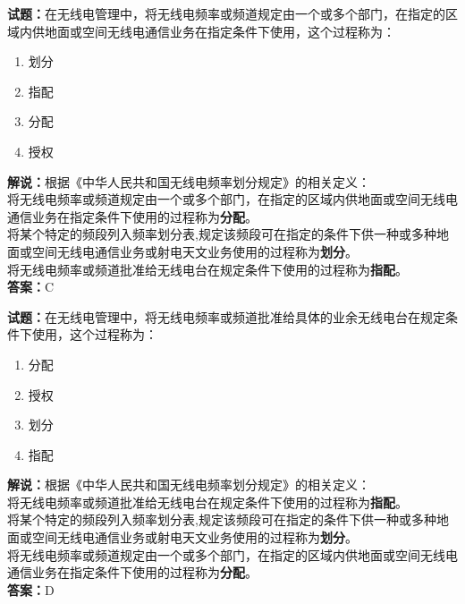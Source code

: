 \documentclass{ctexbook}
\begin{document}
\bigskip


\noindent\textbf{试题：}在无线电管理中，将无线电频率或频道规定由一个或多个部门，在指定的区域内供地面或空间无线电通信业务在指定条件下使用，这个过程称为：
\begin{enumerate}[leftmargin=3em]
\item 划分
\item 指配
\item 分配
\item 授权
\end{enumerate}
\noindent\textbf{解说：}根据《中华人民共和国无线电频率划分规定》的相关定义：\\将无线电频率或频道规定由一个或多个部门，在指定的区域内供地面或空间无线电通信业务在指定条件下使用的过程称为\textbf{分配}。\\将某个特定的频段列入频率划分表,规定该频段可在指定的条件下供一种或多种地面或空间无线电通信业务或射电天文业务使用的过程称为\textbf{划分}。\\将无线电频率或频道批准给无线电台在规定条件下使用的过程称为\textbf{指配}。\\
\textbf{答案：}C


\bigskip


\noindent\textbf{试题：}在无线电管理中，将无线电频率或频道批准给具体的业余无线电台在规定条件下使用，这个过程称为：
\begin{enumerate}[leftmargin=3em]
\item 分配
\item 授权
\item 划分
\item 指配
\end{enumerate}
\noindent\textbf{解说：}根据《中华人民共和国无线电频率划分规定》的相关定义：\\将无线电频率或频道批准给无线电台在规定条件下使用的过程称为\textbf{指配}。\\将某个特定的频段列入频率划分表,规定该频段可在指定的条件下供一种或多种地面或空间无线电通信业务或射电天文业务使用的过程称为\textbf{划分}。\\将无线电频率或频道规定由一个或多个部门，在指定的区域内供地面或空间无线电通信业务在指定条件下使用的过程称为\textbf{分配}。\\
\textbf{答案：}D



\bigskip
\end{document}
